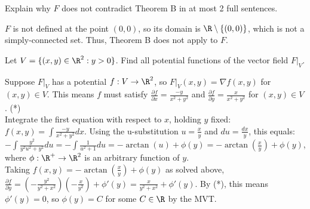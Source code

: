 \documentclass{exam}
\begin{document}
\begin{questions}
\begin{parts}
\item Explain why $F$ does not contradict Theorem B in at most 2 full sentences. 
\begin{answer}{70pt}
$F$ is not defined at the point $(0,0)$, so its domain is $\R \setminus \{(0,0)\}$, which is not a simply-connected set. Thus, Theorem B does not apply to $F$.
\end{answer}
\item \label{Upper} Let $V = \{ (x,y) \in \R^2 : y > 0\}$. Find all potential functions of the vector field  $F|_V$. 
\begin{answer}{430pt}
Suppose $F|_V$ has a potential $f: V \to \R^2$, so $F|_V(x,y) = \nabla f(x,y)$ for $(x,y) \in V$. This means $f$ must satisfy $\tfrac{\partial f}{\partial x} = \tfrac{-y}{x^2+y^2}$ and $\tfrac{\partial f}{\partial y} = \tfrac{x}{x^2+y^2}$ for $(x,y) \in V$. (*)\\

Integrate the first equation with respect to $x$, holding $y$ fixed: $f(x,y) = \int \tfrac{-y}{x^2+y^2} dx$. Using the u-substitution $u = \tfrac{x}{y}$ and $du = \frac{dx}{y}$, this equals: $-\int \frac{y^2}{y^2u^2+y^2} du = -\int \frac{1}{u^2+1} du = -\arctan(u) + \phi(y) = -\arctan(\frac{x}{y}) + \phi(y)$, where $\phi: \R^+ \to \R^2$ is an arbitrary function of $y$.\\

Taking $f(x,y) = -\arctan(\frac{x}{y}) + \phi(y)$ as solved above, $\tfrac{\partial f}{\partial y} = (-\frac{y^2}{y^2+x^2})(-\frac{x}{y^2}) + \phi'(y) = \frac{x}{y^2+x^2} + \phi'(y)$. By (*), this means $\phi'(y) = 0$, so $\phi(y) = C$ for some $C \in \R$ by the MVT.\\


\end{answer}
\end{parts}
\end{questions}
\end{document}

